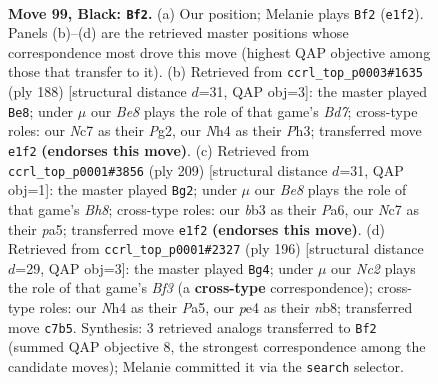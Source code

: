 \documentclass[11pt]{article}
\begin{document}
\clearpage

\begin{figure}[p]\centering
\begin{subfigure}{0.46\textwidth}\centering
\resizebox{\linewidth}{!}{%
\newchessgame
\chessboard[
  setfen={8/1Nn5/7k/8/Pp2P2n/1B2p3/7p/2K1b3 b - - 7 99},
  showmover=false,
  pgfstyle=straightmove, color=movearrow, markmove={e1-f2}
]}
\caption{}
\end{subfigure}\hfill
\begin{subfigure}{0.46\textwidth}\centering
\resizebox{\linewidth}{!}{%
\newchessgame
\chessboard[
  setfen={8/2bB4/8/1P6/5p1p/2k4P/6P1/2K5 w - - 64 95},
  showmover=false,
  pgfstyle=straightmove, color=movearrow, markmove={d7-e8}
]}
\caption{}
\end{subfigure}
\\[4pt]
\begin{subfigure}{0.46\textwidth}\centering
\resizebox{\linewidth}{!}{%
\newchessgame
\chessboard[
  setfen={8/3k4/p7/P2P4/3K1B2/5p2/5P2/7b b - - 21 105},
  showmover=false,
  pgfstyle=straightmove, color=movearrow, markmove={h1-g2}
]}
\caption{}
\end{subfigure}\hfill
\begin{subfigure}{0.46\textwidth}\centering
\resizebox{\linewidth}{!}{%
\newchessgame
\chessboard[
  setfen={1n6/7p/4K3/P1k3P1/8/3b1B2/3B4/8 w - - 37 99},
  showmover=false,
  pgfstyle=straightmove, color=movearrow, markmove={f3-g4}
]}
\caption{}
\end{subfigure}
\caption{\textbf{Move 99, Black: \texttt{Bf2}.} (a) Our position; Melanie plays \texttt{Bf2} (\texttt{e1f2}). Panels (b)--(d) are the retrieved master positions whose correspondence most drove this move (highest QAP objective among those that transfer to it). (b) Retrieved from \texttt{ccrl\_top\_p0003\#1635} (ply 188) [structural distance $d$=31, QAP obj=3]: the master played \texttt{Be8}; under $\mu$ our \emph{Be8} plays the role of that game's \emph{Bd7}; cross-type roles: our \emph{N}c7 as their \emph{P}g2, our \emph{N}h4 as their \emph{P}h3; transferred move \texttt{e1f2} \textbf{(endorses this move)}. (c) Retrieved from \texttt{ccrl\_top\_p0001\#3856} (ply 209) [structural distance $d$=31, QAP obj=1]: the master played \texttt{Bg2}; under $\mu$ our \emph{Be8} plays the role of that game's \emph{Bh8}; cross-type roles: our \emph{b}b3 as their \emph{P}a6, our \emph{N}c7 as their \emph{p}a5; transferred move \texttt{e1f2} \textbf{(endorses this move)}. (d) Retrieved from \texttt{ccrl\_top\_p0001\#2327} (ply 196) [structural distance $d$=29, QAP obj=3]: the master played \texttt{Bg4}; under $\mu$ our \emph{Nc2} plays the role of that game's \emph{Bf3} (a \textbf{cross-type} correspondence); cross-type roles: our \emph{N}h4 as their \emph{P}a5, our \emph{p}e4 as their \emph{n}b8; transferred move \texttt{c7b5}. Synthesis: 3 retrieved analogs transferred to \texttt{Bf2} (summed QAP objective 8, the strongest correspondence among the candidate moves); Melanie committed it via the \texttt{search} selector.}
\label{fig:thought-m197}
\end{figure}
\end{document}
